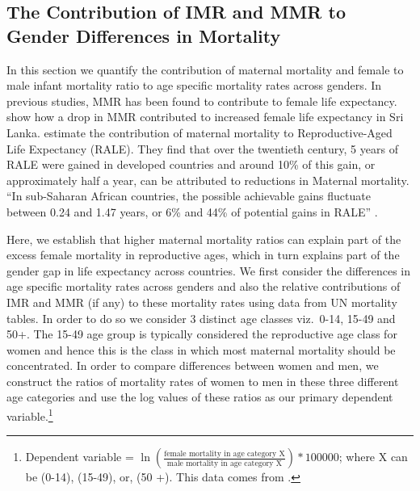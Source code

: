 \documentclass[11pt]{article}
\begin{document}
\begin{spacing}{1.4}
\section{The Contribution of IMR and MMR to Gender Differences in Mortality}
In this section we quantify the contribution of maternal mortality and female to
 male infant mortality ratio to age specific mortality rates across genders. In 
previous studies, MMR has been found to contribute to female life expectancy. 
\citet{jayachandran2008life} show how a drop in MMR contributed to increased 
female life expectancy in Sri Lanka. \citet{canudas2014potential} estimate the 
contribution of maternal mortality to Reproductive-Aged Life Expectancy (RALE).
 They find that over the twentieth century, 5 years of RALE were gained in 
developed countries and around 10\% of this gain, or approximately half a year, 
can be attributed to reductions in Maternal mortality. ``In sub-Saharan African 
countries, the possible achievable gains fluctuate between 0.24 and 1.47 years, 
or 6\% and 44\% of potential gains in RALE'' \citep{canudas2014potential}.

Here, we establish that higher maternal mortality ratios can explain part of the 
excess female mortality in reproductive ages, which in turn explains part of the 
gender gap in life expectancy across countries. We first consider the differences 
in age specific mortality rates across genders and also the relative 
contributions of IMR and MMR (if any) to these mortality rates using data from UN 
mortality tables. In order to do so we consider 3 distinct age classes viz.\ 0-14, 
15-49 and 50+. The 15-49 age group is typically considered the reproductive age 
class for women and hence this is the class in which most maternal mortality 
should be concentrated. In order to compare differences between women and men, 
we construct the ratios of mortality rates of women to men in these three 
different age categories and use the log values of these ratios as our primary 
dependent variable.\footnote{Dependent variable = 
$\ln(\frac{\text{female mortality in age category X}}
{\text{male mortality in age category X}})*100000$; where X can be (0-14), 
(15-49), or, (50 +). This data comes from \citet{UNMortality2012}.}



\end{spacing}
\end{document}
